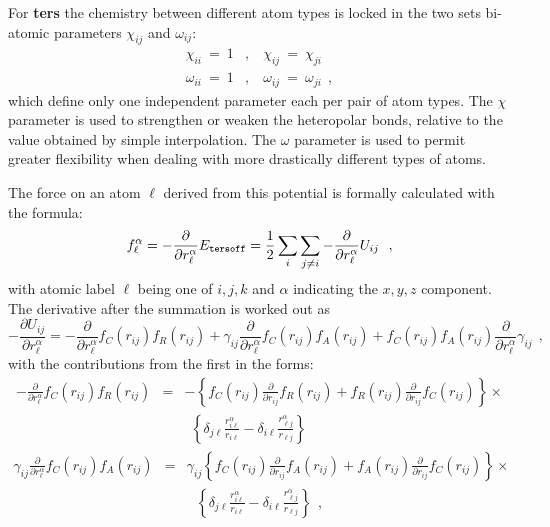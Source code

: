 For {\bf ters} the chemistry between different atom types is locked in
the two sets bi-atomic parameters $\chi_{ij}$ and $\omega_{ij}$:
\begin{eqnarray}
\chi_{ii}~=~1&,&~\chi_{ij}~=~\chi_{ji} \nonumber \\
\omega_{ii}~=~1&,&~\omega_{ij}~=~\omega_{ji}~~,
\end{eqnarray}
which define only one independent parameter each per pair of atom
types.  The $\chi$ parameter is used to strengthen or weaken the
heteropolar bonds, relative to the value obtained by simple
interpolation.  The $\omega$ parameter is used to permit greater
flexibility when dealing with more drastically different types of
atoms.

The force on an atom $\ell$ derived from this potential is
formally calculated with the formula:
\begin{equation}
f_{\ell}^{\alpha} = -\frac{\partial}{\partial r_{\ell}^{\alpha}}
E_{\tt tersoff} = \frac{1}{2} \sum_{i}\sum_{j \neq i}
-\frac{\partial}{\partial r_{\ell}^{\alpha}} U_{ij}~~,
\end{equation}
with atomic label $\ell$ being one of $i,j,k$ and $\alpha$
indicating the $x,y,z$ component.  The derivative after the
summation is worked out as
\begin{equation}
-\frac{\partial U_{ij}}{\partial r_{\ell}^{\alpha}} =
-\frac{\partial}{\partial r_{\ell}^{\alpha}} f_{C}(r_{ij}) f_{R}(r_{ij}) +
 \gamma_{ij} \frac{\partial}{\partial r_{\ell}^{\alpha}} f_{C}(r_{ij}) f_{A}(r_{ij}) +
 f_{C}(r_{ij}) f_{A}(r_{ij}) \frac{\partial}{\partial r_{\ell}^{\alpha}} \gamma_{ij}~~,
\end{equation}
with the contributions from the first in the forms:
\begin{eqnarray}
-\frac{\partial}{\partial r_{\ell}^{\alpha}} f_{C}(r_{ij}) f_{R}(r_{ij})&=&
-\left\{ f_{C}(r_{ij}) \frac{\partial}{\partial r_{ij}} f_{R}(r_{ij}) +
f_{R}(r_{ij}) \frac{\partial}{\partial r_{ij}} f_{C}(r_{ij}) \right\} \times \nonumber \\
& & ~~\left\{ \delta_{j \ell} \frac{r_{i \ell}^{\alpha}}{r_{i \ell}} -
\delta_{i \ell} \frac{r_{\ell j}^{\alpha}}{r_{\ell j}} \right\}
\end{eqnarray}
\begin{eqnarray}
\gamma_{ij} \frac{\partial}{\partial r_{\ell}^{\alpha}} f_{C}(r_{ij}) f_{A}(r_{ij})&=&
\gamma_{ij} \left\{ f_{C}(r_{ij}) \frac{\partial}{\partial r_{ij}} f_{A}(r_{ij}) +
f_{A}(r_{ij}) \frac{\partial}{\partial r_{ij}} f_{C}(r_{ij}) \right\} \times \nonumber \\
& & ~~~\left\{ \delta_{j \ell} \frac{r_{i \ell}^{\alpha}}{r_{i \ell}} -
\delta_{i \ell} \frac{r_{\ell j}^{\alpha}}{r_{\ell j}} \right\}~~,
\end{eqnarray}
